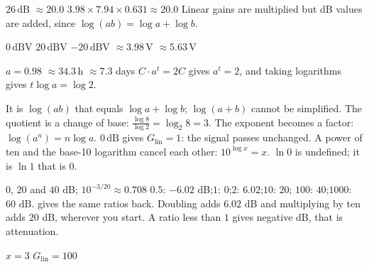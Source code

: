 \begin{facit}
  $26\,\text{dB}$  $\approx 20.0$
 $3.98 \times 7.94 \times 0.631 \approx 20.0$
 Linear gains are multiplied but dB values are added, since
$\log(ab) = \log a + \log b$.

  $0\,\text{dBV}$  $20\,\text{dBV}$  $-20\,\text{dBV}$
 $\approx 3.98\,\text{V}$  $\approx 5.63\,\text{V}$

  $a = 0.98$  $\approx 34.3\,\text{h}$  $\approx 7.3$ days
 $C \cdot a^t = 2C$ gives $a^t = 2$, and taking logarithms gives $t\log a = \log 2$.

  It is $\log(ab)$ that equals $\log a + \log b$; $\log(a + b)$ cannot be
simplified.
 The quotient is a change of base: $\frac{\log 8}{\log 2} = \log_2 8 = 3$.
 The exponent becomes a factor: $\log(a^n) = n\log a$.
 $0\,\text{dB}$ gives $G_{\text{lin}} = 1$: the signal passes unchanged.
 A power of ten and the base-10 logarithm cancel each other: $10^{\log x} = x$.
 $\ln 0$ is undefined; it is $\ln 1$ that is $0$.

  $0$, $20$ and $40$ dB; $10^{-3/20} \approx 0.708$
 $0.5$: $-6.02$ dB;\enspace $1$: $0$;\enspace $2$: $6.02$;\enspace $10$: $20$;\enspace
$100$: $40$;\enspace $1000$: $60$ dB.  gives the same ratios back.
 Doubling adds $6.02$ dB and multiplying by ten adds $20$ dB, wherever you start. A ratio
less than $1$ gives negative dB, that is attenuation.

  $x = 3$  $G_{\text{lin}} = 100$

\end{facit}
